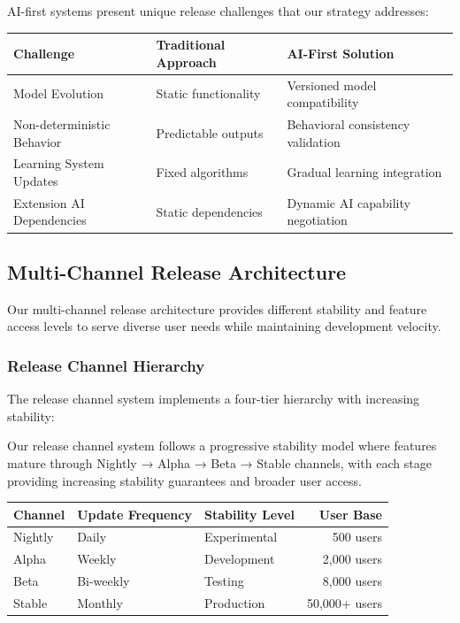 AI-first systems present unique release challenges that our strategy addresses:

\begin{center}
\begin{tabular}{@{}lll@{}}
\toprule
\textbf{Challenge} & \textbf{Traditional Approach} & \textbf{AI-First Solution} \\
\midrule
Model Evolution & Static functionality & Versioned model compatibility \\
Non-deterministic Behavior & Predictable outputs & Behavioral consistency validation \\
Learning System Updates & Fixed algorithms & Gradual learning integration \\
Extension AI Dependencies & Static dependencies & Dynamic AI capability negotiation \\
\bottomrule
\end{tabular}
\end{center}

\subsection*{Multi-Channel Release Architecture}

Our multi-channel release architecture provides different stability and feature access levels to serve diverse user needs while maintaining development velocity.

\subsubsection*{Release Channel Hierarchy}

The release channel system implements a four-tier hierarchy with increasing stability:

\begin{infobox}[title=Release Channel Progression]
Our release channel system follows a progressive stability model where features mature through Nightly → Alpha → Beta → Stable channels, with each stage providing increasing stability guarantees and broader user access.
\end{infobox}

\begin{center}
\begin{tabular}{@{}lllr@{}}
\toprule
\textbf{Channel} & \textbf{Update Frequency} & \textbf{Stability Level} & \textbf{User Base} \\
\midrule
Nightly & Daily & Experimental & 500 users \\
Alpha & Weekly & Development & 2,000 users \\
Beta & Bi-weekly & Testing & 8,000 users \\
Stable & Monthly & Production & 50,000+ users \\
\bottomrule
\end{tabular}
\end{center}

